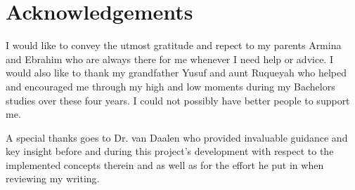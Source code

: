 
\chapter{Acknowledgements}

I would like to convey the utmost gratitude and repect to my parents Armina and Ebrahim who are always there for me whenever I need help or advice. I would also like to thank my grandfather Yusuf and aunt Ruqueyah who helped and encouraged me through my high and low moments during my Bachelors studies over these four years. I could not possibly have better people to support me.

A special thanks goes to Dr. van Daalen who provided invaluable guidance and key insight before and during this project's development with respect to the implemented concepts therein and as well as for the effort he put in when reviewing my writing. 